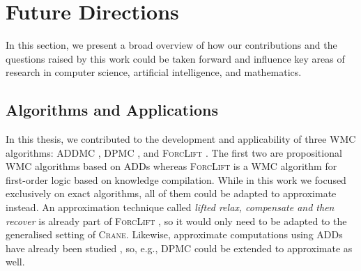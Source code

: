 

\section{Future Directions}\label{sec:future}

In this section, we present a broad overview of how our contributions and the
questions raised by this work could be taken forward and influence key areas of
research in computer science, artificial intelligence, and mathematics.

\subsection{Algorithms and Applications}


In this thesis, we contributed to the development and applicability of three WMC
algorithms: \textsc{ADDMC} \citep{DBLP:conf/aaai/DudekPV20}, \textsc{DPMC}
\citep{DBLP:conf/cp/DudekPV20}, and \textsc{ForcLift}
\citep{DBLP:conf/ijcai/BroeckTMDR11}. The first two are propositional WMC
algorithms based on ADDs whereas \textsc{ForcLift} is a WMC algorithm for
first-order logic based on knowledge compilation. While in this work we focused
exclusively on exact algorithms, all of them could be adapted to approximate
instead. An approximation technique called \emph{lifted relax, compensate and
  then recover} is already part of \textsc{ForcLift}
\citep{DBLP:conf/uai/BroeckCD12}, so it would only need to be adapted to the
generalised setting of \textsc{Crane}. Likewise, approximate computations using
ADDs have already been studied \citep{DBLP:conf/nips/St-AubinHB00}, so, e.g.,
\textsc{DPMC} could be extended to approximate as well.

